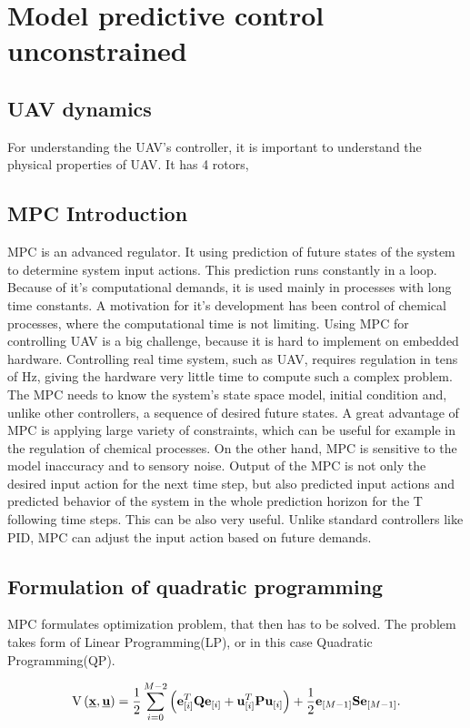 \documentclass{article}
\begin{document}
\section{Model predictive control unconstrained}

\subsection{UAV dynamics}
For understanding the UAV's controller, it is important to understand the physical properties of UAV. It has 4 rotors, 


\subsection{MPC Introduction}
MPC is an advanced regulator. It using prediction of future states of the system to determine system input actions. This prediction runs constantly in a loop. Because of it's computational demands, it is used mainly in processes with long time constants. A motivation for it's development has been control of chemical processes, where the computational time is not limiting. Using MPC for controlling UAV is a big challenge, because it is hard to implement on embedded hardware. Controlling real time system, such as UAV, requires regulation in tens of Hz, giving the hardware very little time to compute such a complex problem.
The MPC needs to know the system's state space model, initial condition and, unlike other controllers, a sequence of desired future states. A great advantage of MPC is applying large variety of constraints, which can be useful for example in the regulation of chemical processes. On the other hand, MPC is sensitive to the model inaccuracy and to sensory noise. Output of the MPC is not only the desired input action for the next time step, but also predicted input actions and predicted behavior of the system in the whole prediction horizon for the T following time steps. This can be also very useful. Unlike standard controllers like PID, MPC can adjust the input action based on future demands.

\subsection{Formulation of quadratic programming}
MPC formulates optimization problem, that then has to be solved. The problem takes form of Linear Programming(LP), or in this case Quadratic Programming(QP). 

\begin{equation}
\label{eq:QP_formulation}
\begin{split}
\mathrm{V}\left(\textbf{\underline{x}}, \textbf{\underline{u}}\right) = \frac{1}{2}\sum_{i=0}^{M-2}\left(\textbf{e}^T_{[i]}\textbf{Q}\textbf{e}_{[i]} + \textbf{u}^T_{[i]}\textbf{P}\textbf{u}_{[i]}\right) + \frac{1}{2}\textbf{e}_{[M-1]}\textbf{S}\textbf{e}_{[M-1]}.
\end{split}
\end{equation}
\end{document}
